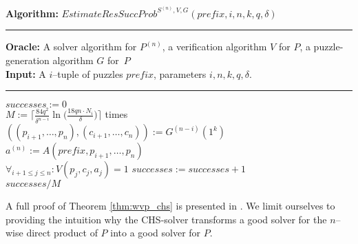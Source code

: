 %
\begin{codeblock}
  \textbf{Algorithm:} $\mathit{EstimateResSuccProb}^{S^{(n)},V, G}(\mathit{prefix}, i, n, k, q, \delta)$
  \medskip \hrule
  \textbf{Oracle:} A solver algorithm for $P^{(n)}$, a verification algorithm $V$ for $P$, a puzzle-generation algorithm $G$ for~$P$\\
  \textbf{Input:} A $i$--tuple of puzzles $\mathit{prefix}$, parameters $i, n, k, q, \delta$.
  \medskip\hrule
  $successes := 0$ \\
  \Repeat $M := \Big\lceil \frac{84q^2}{\delta^{n-i}} \ln \Big(\frac{18qn \cdot N_i}{\delta} \Big) \Big\rceil$ times \\
  \IndI $((p_{i+1}, \dotsc, p_n), (c_{i+1}, \dotsc, c_n)) := G^{(n-i)}(1^k)$\\
  \IndI $a^{(n)} := A(\mathit{prefix}, p_{i+1}, \dotsc, p_{n})$\\
  \IndI \If $\forall_{i + 1\leq j \leq n} : V(p_j, c_j, a_j) = 1$ \Then $\mathit{successes := successes + 1}$ \\
  \Return $successes / M$
\end{codeblock}
%
A full proof of Theorem \ref{thm:wvp_chs} is presented in \cite{canetti2004hardness}.
We limit ourselves to providing the intuition why the CHS-solver transforms a good solver
for the $n$--wise direct product of $P$ into a good solver for $P$.

